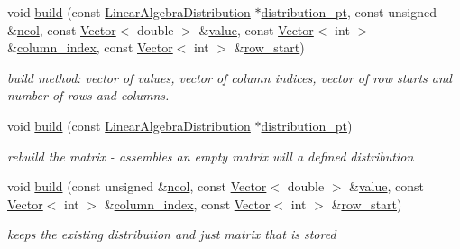 \begin{DoxyCompactItemize}
void \hyperlink{classoomph_1_1CRDoubleMatrix_af44bac2acd071317f96dae49cbb0d977}{build} (const \hyperlink{classoomph_1_1LinearAlgebraDistribution}{Linear\+Algebra\+Distribution} $\ast$\hyperlink{classoomph_1_1DistributableLinearAlgebraObject_a603105384d60c9a3710378af39f538b9}{distribution\+\_\+pt}, const unsigned \&\hyperlink{classoomph_1_1CRDoubleMatrix_a4ed5597d8a34dd14f90b0e6cfb88ca2e}{ncol}, const \hyperlink{classoomph_1_1Vector}{Vector}$<$ double $>$ \&\hyperlink{classoomph_1_1CRDoubleMatrix_ab8220b7c2bb763dab32a4d0fea7da6f4}{value}, const \hyperlink{classoomph_1_1Vector}{Vector}$<$ int $>$ \&\hyperlink{classoomph_1_1CRDoubleMatrix_a21b3dbb8ee74e1247f80ce4506c395f8}{column\+\_\+index}, const \hyperlink{classoomph_1_1Vector}{Vector}$<$ int $>$ \&\hyperlink{classoomph_1_1CRDoubleMatrix_a25f1efd00318183abd8c65efede3f3f4}{row\+\_\+start})
\begin{DoxyCompactList}\small\item\em build method\+: vector of values, vector of column indices, vector of row starts and number of rows and columns. \end{DoxyCompactList}\item 
void \hyperlink{classoomph_1_1CRDoubleMatrix_a7fc397b91a7289df8ee64287ae20e132}{build} (const \hyperlink{classoomph_1_1LinearAlgebraDistribution}{Linear\+Algebra\+Distribution} $\ast$\hyperlink{classoomph_1_1DistributableLinearAlgebraObject_a603105384d60c9a3710378af39f538b9}{distribution\+\_\+pt})
\begin{DoxyCompactList}\small\item\em rebuild the matrix -\/ assembles an empty matrix will a defined distribution \end{DoxyCompactList}\item 
void \hyperlink{classoomph_1_1CRDoubleMatrix_ac04c0787a123256b3dbaf6acf40df4e2}{build} (const unsigned \&\hyperlink{classoomph_1_1CRDoubleMatrix_a4ed5597d8a34dd14f90b0e6cfb88ca2e}{ncol}, const \hyperlink{classoomph_1_1Vector}{Vector}$<$ double $>$ \&\hyperlink{classoomph_1_1CRDoubleMatrix_ab8220b7c2bb763dab32a4d0fea7da6f4}{value}, const \hyperlink{classoomph_1_1Vector}{Vector}$<$ int $>$ \&\hyperlink{classoomph_1_1CRDoubleMatrix_a21b3dbb8ee74e1247f80ce4506c395f8}{column\+\_\+index}, const \hyperlink{classoomph_1_1Vector}{Vector}$<$ int $>$ \&\hyperlink{classoomph_1_1CRDoubleMatrix_a25f1efd00318183abd8c65efede3f3f4}{row\+\_\+start})
\begin{DoxyCompactList}\small\item\em keeps the existing distribution and just matrix that is stored \end{DoxyCompactList}\item 

\end{DoxyCompactItemize}
